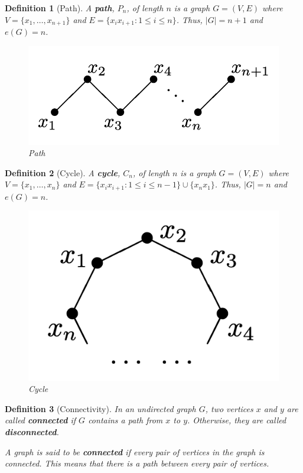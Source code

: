 \documentclass[cm,linguex]{glossa}
\theoremstyle{defn}
\newtheorem{defn}{Definition}
\theoremstyle{axiom}
\theoremstyle{thm}
\theoremstyle{lem}
\theoremstyle{cor}
\theoremstyle{prop}
\theoremstyle{rmk}
\begin{document}
\begin{defn}[Path]
A \textbf{path}, $P_n$, of length $n$ is a graph $G = (V, E)$ where $V = \{x_1, \dots, x_{n + 1}\}$ and $E = \{x_i x_{i + 1} : 1 \leq i \leq n\}$. Thus, $\lvert G \rvert = n + 1$ and $e(G)= n$.

\begin{figure}[H]
\centering
\includegraphics[scale=0.4]{fig/4.png}
\caption{Path}
\end{figure}
\end{defn}

\begin{defn}[Cycle]
A \textbf{cycle}, $C_n$, of length $n$ is a graph $G = (V, E)$ where $V = \{x_1, \dots, x_n\}$ and $E = \{x_i x_{i + 1} : 1 \leq i \leq n - 1\} \cup \{x_n x_1\}$. Thus, $\lvert G \rvert = n$ and $e(G)= n$.

\begin{figure}[H]
\centering
\includegraphics[scale=0.4]{fig/5.png}
\caption{Cycle}
\end{figure}
\end{defn}

\begin{defn}[Connectivity]
In an undirected graph $G$, two vertices $x$ and $y$ are called \textbf{connected} if $G$ contains a \emph{path} from $x$ to $y$. Otherwise, they are called \textbf{disconnected}.

A graph is said to be \textbf{connected} if every pair of vertices in the graph is connected. This means that there is a path between every pair of vertices.
\end{defn}
\end{document}

